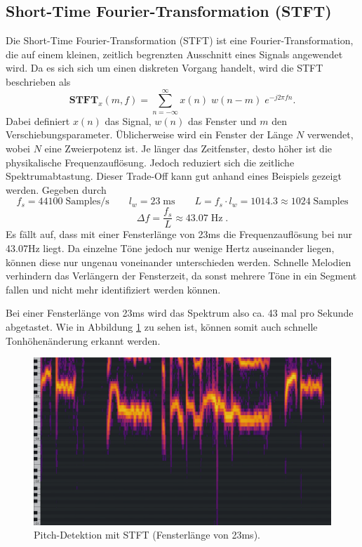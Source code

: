 \subsection{Short-Time Fourier-Transformation (STFT)
\label{autotune:subsection:shortTimeFourierTransformation}}
Die Short-Time Fourier-Transformation (STFT) ist eine Fourier-Transformation, die auf einem kleinen,
zeitlich begrenzten Ausschnitt eines Signals angewendet wird.
Da es sich sich um einen diskreten Vorgang handelt, wird die STFT beschrieben als
\begin{equation}
    \mathbf{STFT}_x(m, f)
    =
    \sum_{n=-\infty}^{\infty}x(n)\;w(n-m)\;e^{-j 2 \pi f n}.
\end{equation}
Dabei definiert $x(n)$ das Signal, $w(n)$ das Fenster und $m$ den Verschiebungsparameter.
Üblicherweise wird ein Fenster der Länge $N$ verwendet, wobei $N$ eine Zweierpotenz ist.
Je länger das Zeitfenster, desto höher ist die physikalische Frequenzauflösung. Jedoch reduziert sich die zeitliche Spektrumabtastung.
Dieser Trade-Off kann gut anhand eines Beispiels gezeigt werden.
Gegeben durch
\[
    f_s = 44100\;\text{Samples/s} \quad\quad l_w = 23\;\text{ms} \quad\quad L = f_s \cdot l_w = 1014.3 \approx 1024\;\text{Samples}
\]
\[
    \Delta f = \frac{f_s}{L}\approx 43.07\;\text{Hz}\;.
\]
Es fällt auf, dass mit einer Fensterlänge von 23\;ms die Frequenzauflösung bei nur 43.07\;Hz liegt.
Da einzelne Töne jedoch nur wenige Hertz auseinander liegen, können diese nur ungenau voneinander unterschieden werden.
Schnelle Melodien verhindern das Verlängern der Fensterzeit, da sonst mehrere Töne in ein Segment fallen und nicht mehr identifiziert werden können.

Bei einer Fensterlänge von 23\;ms wird das Spektrum also ca. 43 mal pro Sekunde abgetastet.
Wie in Abbildung \ref{autotune:fig:pitchDetektionSTFT} zu sehen ist, können somit auch schnelle Tonhöhenänderung erkannt werden.
\begin{figure}
	\centering
	\includegraphics[width=\textwidth]{papers/autotune/images/Pianoscale_Example_Detuned_STFT.png}
	\caption{Pitch-Detektion mit STFT (Fensterlänge von 23\;ms).}
    \label{autotune:fig:pitchDetektionSTFT}
\end{figure}

